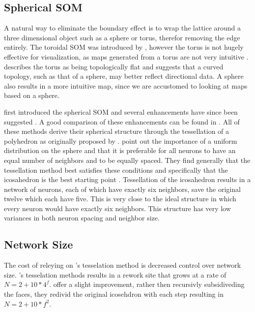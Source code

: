 \documentclass[11pt]{article}
\begin{document}
\subsection{Spherical SOM}
A natural way to eliminate the boundary effect is to wrap the lattice around a
three dimensional object such as a sphere or torus, therefor removing the edge
entirely. The toroidal SOM was introduced by \cite{li1993}, however the torus
is not hugely effective for visualization, as maps generated from a torus are
not very intuitive \citep{ito2000,wu2006}.  \cite{ritter99} describes the
torus as being topologically flat and suggests that a curved topology, such as
that of a sphere, may better reflect directional data.  A sphere also results
in a more intuitive map, since we are accustomed to looking at maps based on a
sphere.

\cite{ritter99} first introduced the spherical SOM and several enhancements have
since been suggested \citep{boudjemai2003,sangole03,Nishio:2006fk,wu2006}.  A
good comparison of these enhancements can be found in \citep{wu2006}.  All of
these methods derive their spherical structure through the tessellation of a
polyhedron as originally proposed by \citeauthor{ritter99}.  \cite{wu2006} point
out the importance of a uniform distribution on the sphere and that it is
preferable for all neurons to have an equal number of neighbors and to be
equally spaced.  They find generally that the tessellation method best satisfies
these conditions and specifically that the icosahedron is the best starting
point \citep{wu2005}. Tessellation of the icosahedron results in a network of
neurons, each of which have exactly six neighbors, save the original twelve which
each have five.  This is very close to the ideal structure in which every neuron
would have exactly six neighbors.  This structure has very low variances in both
neuron spacing and neighbor size.  

\subsection{Network Size}

The cost of releying on \citeauthor{ritter99}'s tesselation method is decreased
control over network size. \citeauthor{ritter99}'s tesselation methods results
in a rework site that grows at a rate of \(N=2+10*4^f\). \cite{wu2006} offer a
slight improvement, rather then recursivly subsidiveding the faces, they redivid
the original icosehdron with each step resulting in \(N=2+10*f^2\).
\end{document}

